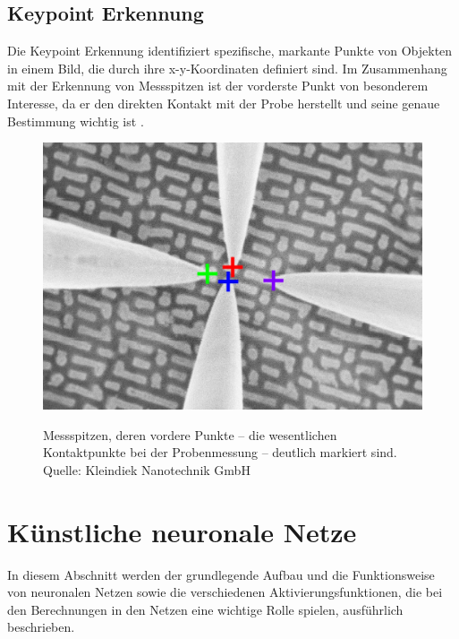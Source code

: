 \subsection{Keypoint Erkennung}
Die Keypoint Erkennung identifiziert spezifische, markante Punkte von Objekten in einem Bild, die durch ihre x-y-Koordinaten definiert sind. Im Zusammenhang mit der Erkennung von Messspitzen ist der vorderste Punkt von besonderem Interesse, da er den direkten Kontakt mit der Probe herstellt und seine genaue Bestimmung wichtig ist \cite{paperswithcode-compvis}.
\begin{figure}[h]
    \centering
    \includegraphics[width=.6\textwidth, angle=0]{img/22 nm_keypoint_cross.png}
    \label{fig:keypdet}
    \caption{Messspitzen, deren vordere Punkte – die wesentlichen Kontaktpunkte bei der Probenmessung – deutlich markiert sind. Quelle: Kleindiek Nanotechnik GmbH}
\end{figure}
\clearpage
\section{Künstliche neuronale Netze}
In diesem Abschnitt werden der grundlegende Aufbau und die Funktionsweise von neuronalen Netzen sowie die verschiedenen Aktivierungsfunktionen, die bei den Berechnungen in den Netzen eine wichtige Rolle spielen, ausführlich beschrieben.
